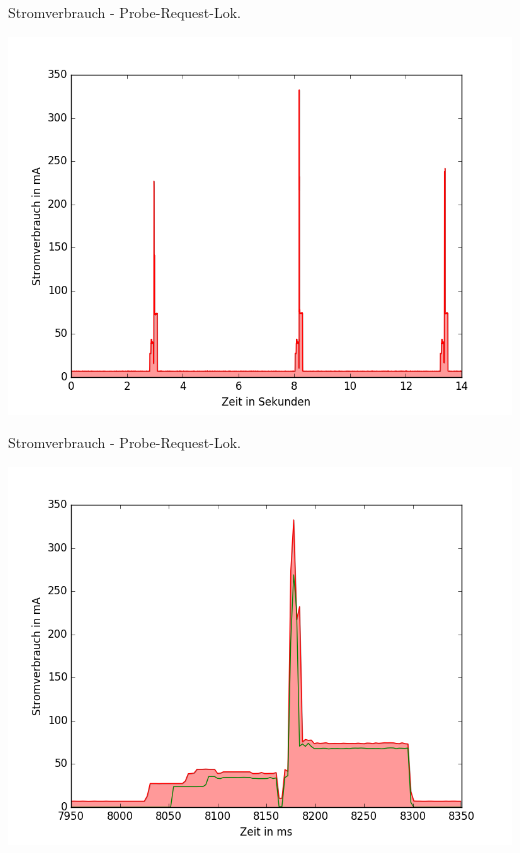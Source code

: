 \documentclass[18pt]{beamer}
\begin{document}
\begin{frame}{Stromverbrauch - Probe-Request-Lok.}
	\begin{minipage}[c][\textheight][t]{\textwidth}
		\centering
		\includegraphics[height=0.85\textheight]{plots/probereqfull.png}
	\end{minipage}
\end{frame}

\begin{frame}{Stromverbrauch - Probe-Request-Lok.}
	\begin{minipage}[c][\textheight][t]{\textwidth}
		\centering
		\includegraphics[height=0.85\textheight]{plots/probereqv.png}
	\end{minipage}
\end{frame}
\end{document}
